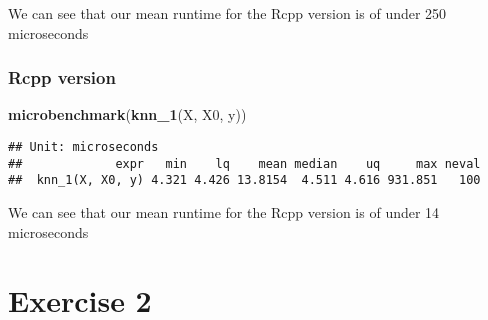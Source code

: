 \documentclass[]{article}
\newenvironment{Shaded}{\begin{snugshade}}{\end{snugshade}}
\newcommand{\KeywordTok}[1]{\textcolor[rgb]{0.13,0.29,0.53}{\textbf{#1}}}
\newcommand{\NormalTok}[1]{#1}
\begin{document}
We can see that our mean runtime for the Rcpp version is of under 250
microseconds

\hypertarget{rcpp-version}{%
\subsubsection{Rcpp version}\label{rcpp-version}}

\begin{Shaded}
\begin{Highlighting}[]
\KeywordTok{microbenchmark}\NormalTok{(}\KeywordTok{knn_1}\NormalTok{(X, X0, y))}
\end{Highlighting}
\end{Shaded}

\begin{verbatim}
## Unit: microseconds
##             expr   min    lq    mean median    uq     max neval
##  knn_1(X, X0, y) 4.321 4.426 13.8154  4.511 4.616 931.851   100
\end{verbatim}

We can see that our mean runtime for the Rcpp version is of under 14
microseconds

\newpage

\hypertarget{exercise-2}{%
\section{Exercise 2}\label{exercise-2}}
\end{document}
